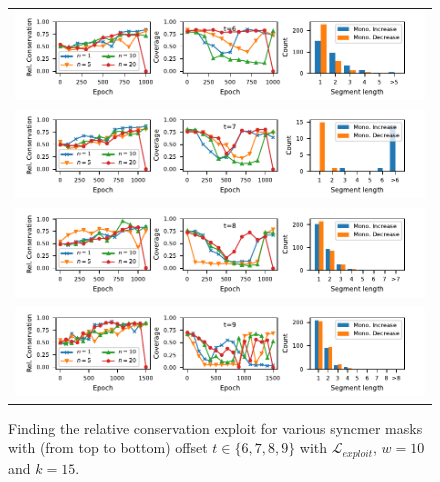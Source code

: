 \begin{figure}[ht]
\centering
\begin{tabular}{c}
\includegraphics[scale=1.075]{masked_mnz_plots/fig6/exploit_t6.pdf} \\
\includegraphics[scale=1.075]{masked_mnz_plots/fig6/exploit_t7.pdf} \\
\includegraphics[scale=1.075]{masked_mnz_plots/fig6/exploit_t8.pdf} \\
\includegraphics[scale=1.075]{masked_mnz_plots/fig6/exploit_t9.pdf} \\
\end{tabular}
\caption{Finding the relative conservation exploit for various syncmer masks with (from top to bottom) offset $t \in \{6,7,8,9\}$ with $\mathcal{L}_{exploit}$, $w=10$ and $k=15$.}
\label{fig:6}
\end{figure}